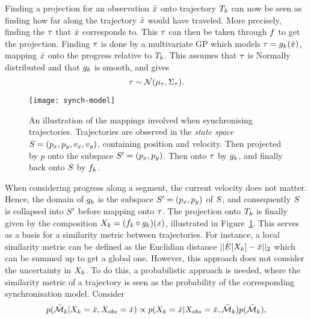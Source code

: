 Finding a projection for an observation $\bar{x}$ onto trajectory
$T_{k}$ can now be seen as finding how far along the trajectory $\bar{x}$
would have traveled. More precisely, finding the $\tau$ that $\bar{x}$
corresponds to. This $\tau$ can then be taken through $f$
to get the projection. Finding $\tau$ is done by a multivariate
GP which models $\tau = g_{k}(\bar{x})$, mapping $\bar{x}$ onto the
progress relative to $T_{k}$. This assumes that $\tau$ is Normally
distributed and that $g_{k}$ is smooth, and gives
\begin{equation}
  \label{eq:g-posterior}
  \tau \sim \mathcal{N}(\mu_{\tau}, \Sigma_{\tau}).
\end{equation}
\begin{figure}
  \centering
  \texttt{[image: synch-model]}
  \caption{An illustration of the mappings involved when synchronising
    trajectories. Trajectories are observed in the \textit{state space} $S =
(p_x, p_y, v_x, v_y)$, containing position and velocity. Then projected by $p$ onto the
    subspace $S' = (p_x, p_y)$. Then onto
    $\tau$ by $g_{k}$, and finally back onto $S$ by
    $f_{k}$.}\label{fig:synch-model}
\end{figure} 
When considering progress along a segment, the current velocity does not matter. 
Hence, the domain of $g_{k}$ is the subspace 
$S' = (p_x, p_y)$ of $S$, and
consequently $S$ is collapsed into $S'$ before
mapping onto $\tau$. 
The projection onto $T_{k}$ is
finally given by the composition $X_{k} = (f_{k} \circ
g_{k})(x)$, illustrated in Figure~\ref{fig:synch-model}.
This serves as a basis for a similarity metric between trajectories.
For instance, a local similarity metric can be defined as the Euclidian
distance $||E[X_{k}] - \bar{x}||_{2}$ which can be summed up
to get a global one. However, this approach does not consider the uncertainty in
$X_{k}$. To do this, a probabilistic approach is needed, where the
similarity metric of a trajectory is seen as the probability of the corresponding
synchronisation model. Consider
\begin{equation}
  \label{eq:model-posterior-probability}
  p(\tilde{\mathcal{M}}_{k} \vert X_{k} = \bar{x}, X_{obs} = \bar{x}) \propto
  p(X_{k} = \bar{x} \vert X_{obs} = \bar{x}, \tilde{\mathcal{M}}_{k})
  p(\tilde{\mathcal{M}}_{k}),
\end{equation}

